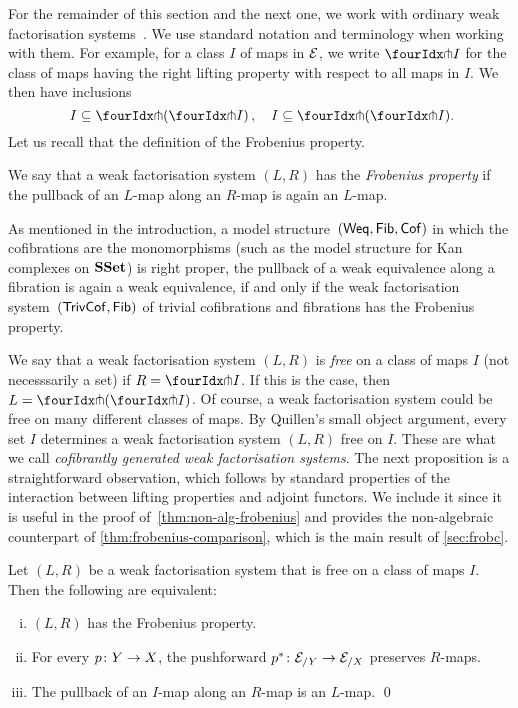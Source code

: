 \documentclass[reqno,10pt,a4paper,oneside,draft]{amsart}
\begin{document}
For the remainder of this section and the next one, we work with ordinary weak factorisation systems~\cite{bousfield-wfs}. We use standard notation and terminology when working with them. For example, for a class $I$ of maps in $\cal{E}$, we write $\liftr{I}$ for the class of maps having the right lifting property with respect to all maps in $I$. We then have inclusions
\begin{equation}
\label{equ:inclus-orthog}
I \subseteq \liftl{(\liftr{I})} \, , \quad 
I \subseteq \liftr{(\liftl{I})} \rlap{.}
\end{equation}
Let us recall that the definition of the Frobenius property.
  
  \begin{definition} We say that a weak factorisation system $(L, R)$ has the \emph{Frobenius property} if the pullback of an $L$-map along  an $R$-map is again an $L$-map. 
  \end{definition} 
  
  As mentioned in the introduction, a model structure~$(\mathsf{Weq}, \Fib, \Cof)$ in which the cofibrations are the monomorphisms (such as the model structure for Kan complexes
  on $\SSet$) is right proper, \ie the pullback of a weak equivalence along a fibration is again a weak equivalence, 
if and only if the weak factorisation system~$(\TrivCof, \Fib)$ of trivial cofibrations and fibrations has the Frobenius property. 

We say that a weak factorisation system $(L, R)$ is \emph{free} on a class of maps $I$ (not necesssarily a set) if $R = \liftr{I}$. If this is the case, then $L = \liftl{(\liftr{I})}$.  
Of course, a weak factorisation system could be free on many different classes of maps.  By Quillen's 
small object argument, every set $I$ determines a weak factorisation system $(L, R)$ free on $I$. These are what we call \emph{cofibrantly generated weak factorisation systems}. 
The next proposition is a straightforward observation, which follows by standard properties of the interaction between lifting properties and adjoint functors. We include it since it is useful
in the proof of~\cref{thm:non-alg-frobenius} and provides the non-algebraic counterpart of \cref{thm:frobenius-comparison}, which is the main result of \cref{sec:frobc}. 



\begin{proposition} 
\label{thm:frobenius-equivalence}
Let $(L, R)$ be a weak factorisation system that is free on a class of maps $I$. Then the following are equivalent:
\begin{enumerate}[(i)] 
\item $(L,R)$ has the Frobenius property. 
\item For every $p \co Y \to X$, the pushforward $p^* \co \cal{E}_{/Y} \to \cal{E}_{/X}$ preserves $R$-maps.
\item The pullback of an $I$-map along 
an $R$-map is an $L$-map. \qed
\end{enumerate}
\end{proposition} 
\end{document}
